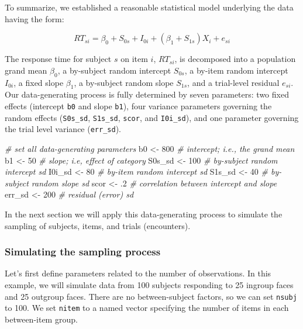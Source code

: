 \documentclass[man,floatsintext]{apa6}
\newenvironment{Shaded}{\begin{snugshade}}{\end{snugshade}}
\newcommand{\CommentTok}[1]{\textcolor[rgb]{0.56,0.35,0.01}{\textit{#1}}}
\newcommand{\DecValTok}[1]{\textcolor[rgb]{0.00,0.00,0.81}{#1}}
\newcommand{\FloatTok}[1]{\textcolor[rgb]{0.00,0.00,0.81}{#1}}
\newcommand{\NormalTok}[1]{#1}
\newcommand{\StringTok}[1]{\textcolor[rgb]{0.31,0.60,0.02}{#1}}
\begin{document}
To summarize, we established a reasonable statistical model underlying the data having the form:

\begin{equation}
RT_{si} = \beta_0 + S_{0s} + I_{0i} + \left(\beta_1 + S_{1s}\right) X_i + e_{si}
\end{equation}

The response time for subject \(s\) on item \(i\), \(RT_{si}\), is decomposed into a population grand mean \(\beta_0\), a by-subject random intercept \(S_{0s}\), a by-item random intercept \(I_{0i}\), a fixed slope \(\beta_1\), a by-subject random slope \(S_{1s}\), and a trial-level residual \(e_{si}\). Our data-generating process is fully determined by seven parameters: two fixed effects (intercept \texttt{b0} and slope \texttt{b1}), four variance parameters governing the random effects (\texttt{S0s\_sd}, \texttt{S1s\_sd}, \texttt{scor}, and \texttt{I0i\_sd}), and one parameter governing the trial level variance (\texttt{err\_sd}).

\begin{Shaded}
\begin{Highlighting}[]
\CommentTok{# set all data-generating parameters}
\NormalTok{b0     <-}\StringTok{ }\DecValTok{800} \CommentTok{# intercept; i.e., the grand mean}
\NormalTok{b1     <-}\StringTok{  }\DecValTok{50} \CommentTok{# slope; i.e, effect of category}
\NormalTok{S0s_sd <-}\StringTok{ }\DecValTok{100} \CommentTok{# by-subject random intercept sd}
\NormalTok{I0i_sd <-}\StringTok{  }\DecValTok{80} \CommentTok{# by-item random intercept sd}
\NormalTok{S1s_sd <-}\StringTok{  }\DecValTok{40} \CommentTok{# by-subject random slope sd}
\NormalTok{scor   <-}\StringTok{  }\FloatTok{.2} \CommentTok{# correlation between intercept and slope}
\NormalTok{err_sd <-}\StringTok{ }\DecValTok{200} \CommentTok{# residual (error) sd}
\end{Highlighting}
\end{Shaded}

In the next section we will apply this data-generating process to simulate the sampling of subjects, items, and trials (encounters).

\hypertarget{simulating-the-sampling-process}{%
\subsubsection{Simulating the sampling process}\label{simulating-the-sampling-process}}

Let's first define parameters related to the number of observations. In this example, we will simulate data from 100 subjects responding to 25 ingroup faces and 25 outgroup faces. There are no between-subject factors, so we can set \texttt{nsubj} to 100. We set \texttt{nitem} to a named vector specifying the number of items in each between-item group.
\end{document}
